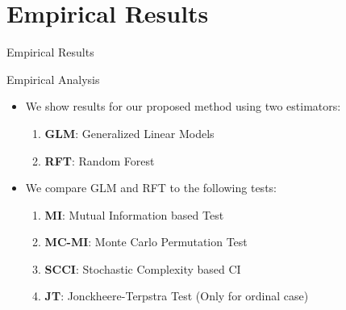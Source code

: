 \documentclass{beamer}
\def\ci{\perp\!\!\!\!\!\perp}
\begin{document}
\section{Empirical Results}
\begin{frame}
	\begin{center} \Huge{Empirical Results} \end{center}
\end{frame}
\begin{frame}{Empirical Analysis}
	\begin{itemize}
		\setlength\itemsep{1em}
		\item We show results for our proposed method using two estimators:
			\begin{enumerate}
				\item \textbf{GLM}: Generalized Linear Models
				\item \textbf{RFT}: Random Forest
			\end{enumerate}
		\item We compare GLM and RFT to the following tests:
			\begin{enumerate}
				\item \textbf{MI}: Mutual Information based Test
				\item \textbf{MC-MI}: Monte Carlo Permutation Test
				\item \textbf{SCCI}: Stochastic Complexity based CI \footnotemark
				\item \textbf{JT}: Jonckheere-Terpstra Test (Only for ordinal case)
			\end{enumerate}
	\end{itemize}
\end{frame}
\end{document}
